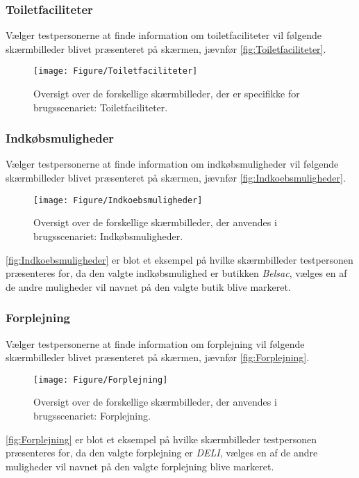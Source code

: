 \subsubsection*{Toiletfaciliteter}
%
Vælger testpersonerne at finde information om toiletfaciliteter vil følgende skærmbilleder blivet præsenteret på skærmen, jævnfør \autoref{fig:Toiletfaciliteter}. 
%
\begin{figure}[H]
\centering
\texttt{[image: Figure/Toiletfaciliteter]} 
\caption{Oversigt over de forskellige skærmbilleder, der er specifikke for brugsscenariet: Toiletfaciliteter.}
\label{fig:Toiletfaciliteter}
\end{figure}
\noindent
%  
\subsubsection*{Indkøbsmuligheder}
%
Vælger testpersonerne at finde information om indkøbsmuligheder vil følgende skærmbilleder blivet præsenteret på skærmen, jævnfør \autoref{fig:Indkoebsmuligheder}. 
%
\begin{figure}[H]
\centering
\texttt{[image: Figure/Indkoebsmuligheder]} 
\caption{Oversigt over de forskellige skærmbilleder, der anvendes i brugsscenariet: Indkøbsmuligheder.}
\label{fig:Indkoebsmuligheder}
\end{figure}
\noindent
% 
\autoref{fig:Indkoebsmuligheder} er blot et eksempel på hvilke skærmbilleder testpersonen præsenteres for, da den valgte indkøbsmulighed er butikken \textit{Belsac}, vælges en af de andre muligheder vil navnet på den valgte butik blive markeret. 

\subsubsection*{Forplejning}
%
Vælger testpersonerne at finde information om forplejning vil følgende skærmbilleder blivet præsenteret på skærmen, jævnfør \autoref{fig:Forplejning}. 
%
\begin{figure}[H]
\centering
\texttt{[image: Figure/Forplejning]} 
\caption{Oversigt over de forskellige skærmbilleder, der anvendes i brugsscenariet: Forplejning.}
\label{fig:Forplejning}
\end{figure}
\noindent
% 
\autoref{fig:Forplejning} er blot et eksempel på hvilke skærmbilleder testpersonen præsenteres for, da den valgte forplejning er \textit{DELI}, vælges en af de andre muligheder vil navnet på den valgte forplejning blive markeret. 

